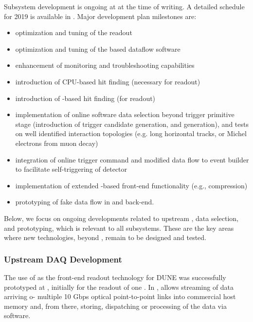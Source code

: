 
Subsystem development is ongoing at  at the time of
writing. A detailed schedule for 2019 is available
in \cite{bib:docdb14095}. Major development plan milestones are:
\begin{itemize}
\item optimization and tuning of the  readout
\item optimization and tuning of the  based dataflow software
\item enhancement of monitoring and troubleshooting capabilities
\item introduction of CPU-based hit finding (necessary for  readout)
\item introduction of -based hit finding (for  readout)
\item implementation of online software data selection beyond trigger
primitive stage (introduction of trigger candidate generation, and
 generation), and tests on well identified interaction
topologies (e.g. long horizontal tracks, or Michel electrons from muon decay)
\item integration of online trigger command and modified data flow to event
builder to facilitate self-triggering of detector
\item implementation of extended -based front-end functionality
(e.g., compression)
\item prototyping of fake  data flow in  and back-end.
\end{itemize}

Below, we focus on ongoing developments related to upstream ,
data selection, and  prototyping, which is relevant to all  subsystems. These are the key areas where new technologies, beyond , remain to be designed and tested.


\subsubsection{Upstream DAQ Development}

The use of  as the front-end readout technology for DUNE was
successfully prototyped at , initially for the readout of one
. In ,  allows streaming of data arriving o- multiple 10
Gbps optical point-to-point links into commercial host memory and,
from there, storing, dispatching or processing of the data via
software. 

